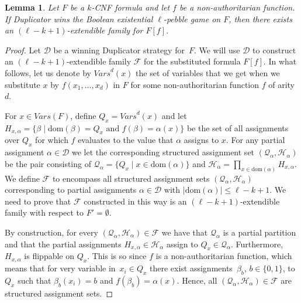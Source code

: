 \documentclass[11pt]{article}
\numberwithin{equation}{section}
\newtheorem{lemma}[theorem]{Lemma}
\theoremstyle{definition}
\theoremstyle{plain}
\theoremstyle{plain}
\theoremstyle{definition}
\newcommand{\domainof}[1]{\ensuremath{\mathrm{dom} ( #1 )}}
\newcommand{\set}[1]{\{ #1 \}}
\newcommand{\setdescr}[3][\mid]{\set{ #2 #1 #3 }}
\newcommand{\setsize}[1]{\lvert#1\rvert}
\newcommand{\setsofvarsorlit}[2]{\mathit{#1}({#2})}
\newcommand{\vars}[1]{\setsofvarsorlit{Vars}{#1}}
\newcommand{\pebdeg}{\ensuremath{d}}
\newcommand{\substform}[2]{{#1}[{#2}]}
\newcommand{\farity}{d}
\newcommand{\flippable}{flippable\xspace}
\newcommand{\kextendibleNok}{extendible\xspace}
\newcommand{\partitionnot}{\mathcal{Q}}
\newcommand{\assignmentsetnot}{\mathcal{H}}
\newcommand{\structuredassignmentsnot}[1][]{(\partitionnot #1,\assignmentsetnot #1)}
\newcommand{\kextendfamily}{\ensuremath{\mathcal{F}}\xspace}
\newcommand{\formulakwidth}{k}
\newcommand{\adpebblenumber}{\ell}
\newcommand{\adduplicatorfamily}{\mathcal{D}}
\newcommand{\nonauthor}{non-author\-i\-tar\-ian\xspace}
\newcommand{\setsofvarsorlitsup}[3]{\mathit{#1}^{#2}({#3})}
\newcommand{\variablecopies}[1]{\setsofvarsorlitsup{Vars}{\pebdeg}{#1}}
\begin{document}
\begin{lemma}
  \label{lem:substitution}
  Let $F$ be a $\formulakwidth$-CNF formula and let $f$ be a
  \nonauthor{} function.
%
  If Duplicator wins the
  Boolean existential $\adpebblenumber$-pebble game on $F$, then there
  exists an $(\adpebblenumber - \formulakwidth + 1)$-\kextendibleNok{}
  family for 
%
  $\substform{F}{f}$.
%
%
%
\end{lemma}

\begin{proof}
  Let $\adduplicatorfamily$ be a winning Duplicator strategy for~$F$. 
  We will use 
  $\adduplicatorfamily$
  to construct an 
  $(\adpebblenumber - \formulakwidth + 1)$-\kextendibleNok family 
  $\kextendfamily$ for the substituted formula
  $\substform{F}{f}$. 
  In what follows, let us denote by
  $\variablecopies{x}$ 
  the set of
  variables that we get when we substitute $x$ by 
  $f (x_1, \ldots, x_{\farity})$ in $F$ 
  for some \nonauthor function $f$ of arity~$\farity$.

%
%
%
%
%
%
%
%
%
%
%
%
%
%
%
%
%
%
%
%
%
%
%
%
%
%
%

  For $x \in \vars{F}$,
  define
  $Q_x = \variablecopies{x}$
  and let
  $H_{x,\alpha} = 
  \setdescr{\beta}{\domainof{\beta} = Q_x \text{ and } f(\beta) = \alpha(x)}
%
%
  $
  be the set of all assignments over
  $Q_x$ for which $f$ evaluates to the value that $\alpha$ assigns to $x$.
  For any partial assignment 
  $\alpha \in \adduplicatorfamily$
  we let the corresponding structured assignment set
  $\structuredassignmentsnot[_\alpha]$ be the pair 
  consisting
  of $\partitionnot_\alpha =
  \setdescr{Q_x}{x \in \domainof{\alpha}}$ 
  and 
  $\assignmentsetnot_\alpha = \prod_{x \in \domainof{\alpha}} H_{x,\alpha}$.
  We define $\kextendfamily$ to encompass all
  structured assignment sets 
  $\structuredassignmentsnot[_\alpha]$ 
  corresponding to partial assignments 
  $\alpha \in \adduplicatorfamily$
  with 
  $\setsize{\domainof{\alpha}} \leq \adpebblenumber - \formulakwidth + 1$.
  We need to prove that
  $\kextendfamily$ 
  constructed in this way is an 
  $(\adpebblenumber - \formulakwidth + 1)$-\kextendibleNok 
  family with respect to 
  $F' = \emptyset$. 
  
%
%
%
%
%
%
%
%
%
%
%
%
  By construction, for every
  $\structuredassignmentsnot[_\alpha] \in \kextendfamily$
  we have that 
  $\partitionnot_\alpha$ 
  is a partial partition and that the partial assignments
  $H_{x,\alpha} \in \assignmentsetnot_\alpha$ 
  assign to 
  $Q_x \in \partitionnot_\alpha$.
  Furthermore, 
  $H_{x,\alpha}$ is \flippable on $Q_x$.
  This is so since 
  $f$ is a \nonauthor{} function, which means that 
%
%
  for very variable in~$x_i \in Q_x$
  there exist assignments~$\beta_b$, $b \in \set{0,1}$,
  to~$Q_x$
  such that $\beta_b(x_i) = b$
  and
  $f(\beta_b) = \alpha(x)$.
  Hence, all  
  $\structuredassignmentsnot[_\alpha] \in \kextendfamily$
  are structured assignment sets.



\end{proof}
\end{document}
